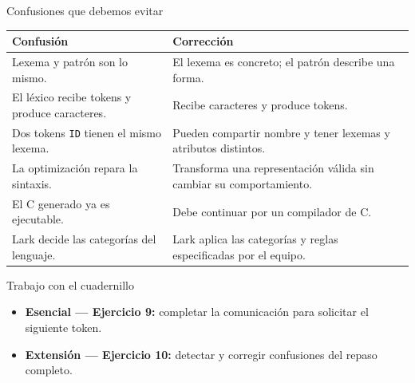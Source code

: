 \documentclass[11pt,spanish]{beamer}
\newcommand{\actividad}[1]{\textbf{\textcolor{Rojo}{#1}}}
\begin{document}
\begin{frame}{Confusiones que debemos evitar}
\vfill

\begin{center}
\scriptsize
\renewcommand{\arraystretch}{1.2}
\begin{tabular}{|L{.39\textwidth}|L{.47\textwidth}|}
\hline
\textbf{Confusión} & \textbf{Corrección} \tabularnewline
\hline
Lexema y patrón son lo mismo. & El lexema es concreto; el patrón describe una forma. \tabularnewline
\hline
El léxico recibe tokens y produce caracteres. & Recibe caracteres y produce tokens. \tabularnewline
\hline
Dos tokens \texttt{ID} tienen el mismo lexema. & Pueden compartir nombre y tener lexemas y atributos distintos. \tabularnewline
\hline
La optimización repara la sintaxis. & Transforma una representación válida sin cambiar su comportamiento. \tabularnewline
\hline
El \textsc{C} generado ya es ejecutable. & Debe continuar por un compilador de \textsc{C}. \tabularnewline
\hline
Lark decide las categorías del lenguaje. & Lark aplica las categorías y reglas especificadas por el equipo. \tabularnewline
\hline
\end{tabular}
\end{center}

\vfill
\end{frame}

\begin{frame}{Trabajo con el cuadernillo}
\vfill

\begin{center}
\end{center}

\bigskip

\begin{itemize}
\item \textbf{Esencial --- Ejercicio 9:} completar la comunicación para solicitar el siguiente token.
\item \textbf{Extensión --- Ejercicio 10:} detectar y corregir confusiones del repaso completo.
\end{itemize}

\vfill
\end{frame}
\end{document}

